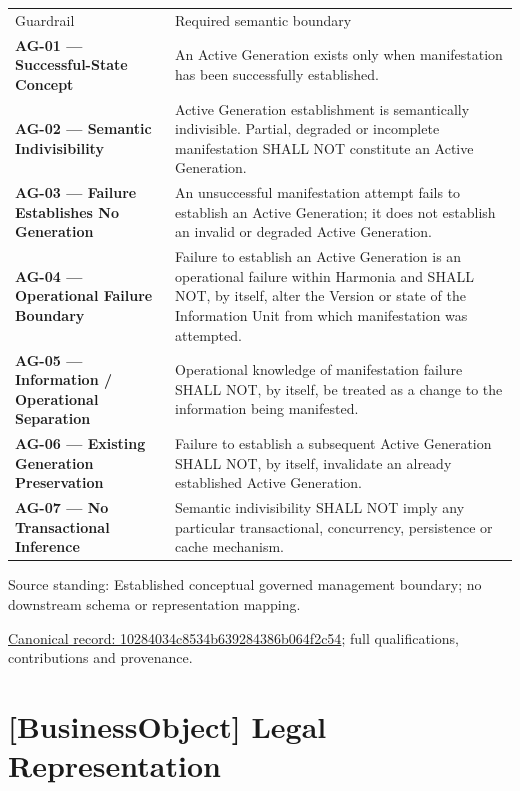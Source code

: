 \begin{longtable}{>{\raggedright\arraybackslash}p{}>{\raggedright\arraybackslash}p{}}
Guardrail & Required semantic boundary \\
\textbf{AG-01 — Successful-State Concept} & An Active Generation exists only when manifestation has been successfully established. \\
\textbf{AG-02 — Semantic Indivisibility} & Active Generation establishment is semantically indivisible. Partial, degraded or incomplete manifestation SHALL NOT constitute an Active Generation. \\
\textbf{AG-03 — Failure Establishes No Generation} & An unsuccessful manifestation attempt fails to establish an Active Generation; it does not establish an invalid or degraded Active Generation. \\
\textbf{AG-04 — Operational Failure Boundary} & Failure to establish an Active Generation is an operational failure within Harmonia and SHALL NOT, by itself, alter the Version or state of the Information Unit from which manifestation was attempted. \\
\textbf{AG-05 — Information / Operational Separation} & Operational knowledge of manifestation failure SHALL NOT, by itself, be treated as a change to the information being manifested. \\
\textbf{AG-06 — Existing Generation Preservation} & Failure to establish a subsequent Active Generation SHALL NOT, by itself, invalidate an already established Active Generation. \\
\textbf{AG-07 — No Transactional Inference} & Semantic indivisibility SHALL NOT imply any particular transactional, concurrency, persistence or cache mechanism. \\
\end{longtable}


Source standing: Established conceptual governed management boundary; no downstream schema or representation mapping.


{\footnotesize \href{../../../../continuum/business/business-object/10284034c8534b639284386b064f2c54.md}{Canonical record: 10284034c8534b639284386b064f2c54}; full qualifications, contributions and provenance.}\par
\section{[BusinessObject] Legal Representation}

